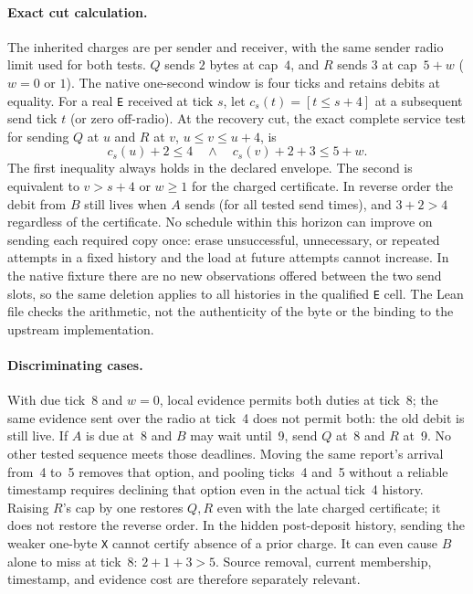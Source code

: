 \documentclass{article}
\begin{document}
\paragraph{Exact cut calculation.}
The inherited charges are per sender and receiver, with the same sender
radio limit used for both tests. $Q$ sends $2$ bytes at cap~$4$, and
$R$ sends $3$ at cap~$5+w$ ($w=0$ or $1$). The native one-second
window is four ticks and retains debits at equality. For a real
\texttt{E} received at tick $s$, let $c_s(t)=[t\le s+4]$ at a
subsequent send tick $t$ (or zero off-radio). At the recovery cut, the
exact complete service test for sending $Q$ at $u$ and $R$ at $v$,
$u\le v\le u+4$, is
\[
       c_s(u)+2\le4\quad\land\quad c_s(v)+2+3\le5+w.
\]
The first inequality always holds in the declared envelope. The second
is equivalent to $v>s+4$ or $w\ge1$ for the charged certificate.
In reverse order the debit from $B$ still lives when $A$ sends
(for all tested send times), and $3+2>4$ regardless of the certificate.
No schedule within this horizon can improve on sending each required
copy once: erase unsuccessful, unnecessary, or repeated attempts in
a fixed history and the load at future attempts cannot increase. In the
native fixture there are no new observations offered between the two
send slots, so the same deletion applies to all histories in the
qualified \texttt{E} cell. The Lean file checks the arithmetic, not the
authenticity of the byte or the binding to the upstream implementation.

\paragraph{Discriminating cases.}
With due tick~8 and $w=0$, local evidence permits both duties at tick~8;
the same evidence sent over the radio at tick~4 does not permit both:
the old debit is still live. If $A$ is due at~8 and $B$ may wait until~9,
send $Q$ at~8 and $R$ at~9. No other tested sequence meets those
deadlines. Moving the same report's arrival from~4 to~5 removes that
option, and pooling ticks~4 and~5 without a reliable timestamp
requires declining that option even in the actual tick~4 history.
Raising $R$'s cap by one restores $Q,R$ even with the late charged
certificate; it does not restore the reverse order. In the hidden
post-deposit history, sending the weaker one-byte \texttt{X} cannot
certify absence of a prior charge. It can even cause $B$ alone to
miss at tick~8: $2+1+3>5$. Source removal, current membership,
timestamp, and evidence cost are therefore separately relevant.
\end{document}
